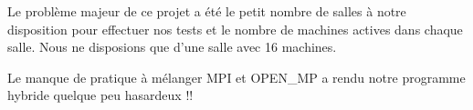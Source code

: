 \par Le problème majeur de ce projet a été le petit nombre de salles à notre disposition 
pour effectuer nos tests et le nombre de machines actives dans chaque salle.
Nous ne disposions que d'une salle avec 16 machines. 

\par Le manque de pratique à mélanger MPI et OPEN\_MP a rendu notre programme 
hybride quelque peu hasardeux !!
